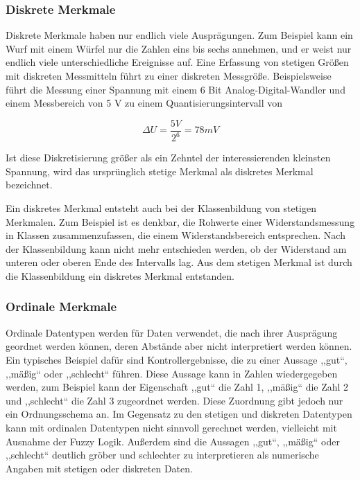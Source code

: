\subsubsection{Diskrete Merkmale}

\noindent Diskrete Merkmale haben nur endlich viele Auspr\"{a}gungen. Zum Beispiel kann ein Wurf mit einem W\"{u}rfel nur die Zahlen eins bis sechs annehmen, und er weist nur endlich viele unterschiedliche Ereignisse auf. Eine Erfassung von stetigen Gr\"{o}{\ss}en mit diskreten Messmitteln f\"{u}hrt zu einer diskreten Messgr\"{o}{\ss}e. Beispielsweise f\"{u}hrt die Messung einer Spannung mit einem 6 Bit Analog-Digital-Wandler und einem Messbereich von 5 V zu einem Quantisierungsintervall von 

\begin{equation}\label{eq:threeone}
\Delta U=\dfrac{5 V}{2^{6} } =78 mV
\end{equation}

\noindent Ist diese Diskretisierung gr\"{o}{\ss}er als ein Zehntel der interessierenden kleinsten Spannung, wird das urspr\"{u}nglich stetige Merkmal als diskretes Merkmal bezeichnet. \newline

\noindent Ein diskretes Merkmal entsteht auch bei der Klassenbildung von stetigen Merkmalen. Zum Beispiel ist es denkbar, die Rohwerte einer Widerstandsmessung in Klassen zusammenzufassen, die einem Widerstandsbereich entsprechen. Nach der Klassenbildung kann nicht mehr entschieden werden, ob der Widerstand am unteren oder oberen Ende des Intervalls lag. Aus dem stetigen Merkmal ist durch die Klassenbildung ein diskretes Merkmal entstanden.

\subsubsection{Ordinale Merkmale}

\noindent Ordinale Datentypen werden f\"{u}r Daten verwendet, die nach ihrer Auspr\"{a}gung geordnet werden k\"{o}nnen, deren Abst\"{a}nde aber nicht interpretiert werden k\"{o}nnen. Ein typisches Beispiel daf\"{u}r sind Kontrollergebnisse, die zu einer Aussage ,,gut``, ,,m\"{a}{\ss}ig`` oder ,,schlecht`` f\"{u}hren. Diese Aussage kann in Zahlen wiedergegeben werden, zum Beispiel kann der Eigenschaft ,,gut`` die Zahl 1, ,,m\"{a}{\ss}ig`` die Zahl 2 und ,,schlecht`` die Zahl 3 zugeordnet werden. Diese Zuordnung gibt jedoch nur ein Ordnungsschema an. Im Gegensatz zu den stetigen und diskreten Datentypen kann mit ordinalen Datentypen nicht sinnvoll gerechnet werden, vielleicht mit Ausnahme der Fuzzy Logik. Au{\ss}erdem sind die Aussagen ,,gut``, ,,m\"{a}{\ss}ig`` oder ,,schlecht`` deutlich gr\"{o}ber und schlechter zu interpretieren als numerische Angaben mit stetigen oder diskreten Daten.


